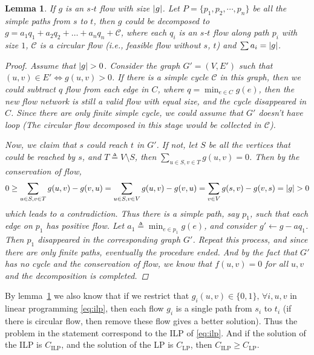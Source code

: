 \documentclass[12pt, a4paper]{article}
\DeclarePairedDelimiter{\abs}{\lvert}{\rvert}
\newtheorem{lemma}{Lemma}
\newcommand{\defeq}{\triangleq}
\begin{document}
\begin{lemma} \label{lemma:decomp}
  If $g$ is an $s$-$t$ flow with size $\abs{g}$. Let $P = \{p_1, p_2, \cdots, p_n\}$ be all
  the simple paths from $s$ to $t$, then $g$ could be decomposed to
  $g = a_1 q_1 + a_2 q_2 + \dots + a_n q_n + \mathcal{C}$, where each $q_i$ is an $s$-$t$
  flow along path $p_i$ with size $1$, $\mathcal{C}$ is a circular flow (i.e., feasible flow
  without $s$, $t$) and $\sum a_i = \abs{g}$.

  \begin{proof}
    Assume that $\abs{g} > 0$. Consider the graph $G' = (V, E')$ such that
    $(u, v) \in E' \iff g(u, v) > 0$. If there is a simple cycle $\mathcal{C}$ in this graph,
    then we could subtract $q$ flow
    from each edge in $C$, where $q = \min_{e \in C} g(e)$,
    then the new flow network is still a valid flow with equal size, and the cycle disappeared in $C$.
    Since there are only finite simple cycle,
    we could assume that $G'$ doesn't have loop (The circular flow decomposed in this stage
    would be collected in $\mathcal{C}$).

    Now, we claim that $s$ could reach $t$ in $G'$.
    If not, let $S$ be all the vertices that could be reached by $s$, and $T \defeq V \setminus S$,
    then $\sum_{u \in S, v \in T} g(u, v) = 0$. Then by the conservation of flow,
    \[ 0 \geq \sum_{u \in S, v \in T} g(u, v) - g(v, u) = \sum_{u \in S, v \in V} g(u, v) - g(v, u)
      = \sum_{v \in V} g(s, v) - g(v, s) = \abs{g} > 0 \]
    which leads to a contradiction. Thus there is a simple path, say $p_1$, such that each edge on $p_1$
    has positive flow. Let $a_1 \defeq \min_{e \in p_1} g(e)$, and consider $g' \gets g - a q_1$.
    Then $p_1$ disappeared in the corresponding graph $G'$. Repeat this process,
    and since there are only finite paths,
    eventually the procedure ended. And by the fact that $G'$ has no cycle and the conservation of flow,
    we know that $f(u, v) = 0$ for all $u, v$ and the decomposition is completed.
  \end{proof}
\end{lemma}

By lemma~\ref{lemma:decomp} we also know that if we restrict that $g_i(u, v) \in \{0, 1\}, \, \forall i, u, v$
in linear programming \eqref{eq:ilp},
then each flow $g_i$ is a single path from $s_i$ to $t_i$ (if there is circular flow, then remove these
flow gives a better solution). Thus the problem in the statement correspond to the ILP of \eqref{eq:ilp}.
And if the solution of the ILP is $C_{\text{ILP}}$, and the solution of the LP is $C_{\text{LP}}$,
then $C_{\text{ILP}} \geq C_{\text{LP}}$.
\end{document}
